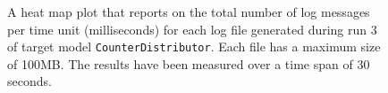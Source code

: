 \begin{figure}[htbp]
\centering
\begin{minipage}{1\textwidth}
  \centering
\end{minipage}
\caption{A heat map plot that reports on the total number of log messages per time unit (milliseconds) for each log file generated during run 3 of target model \texttt{CounterDistributor}. Each file has a maximum size of 100MB. The results have been measured over a time span of 30 seconds.}
\label{figure:throughput_sum_counterdistributor_3}
\end{figure}